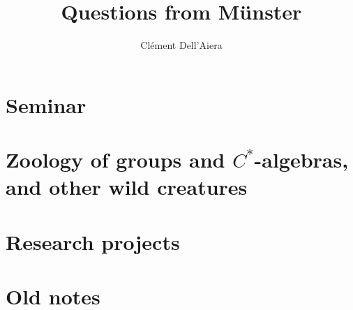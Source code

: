 \documentclass[a4paper,12pt]{book}
\title{\textbf{Questions from Münster}}
\date{}
\author{ Clément Dell'Aiera}
\begin{document}
\maketitle

\pagestyle{plain}
\tableofcontents

\pagestyle{fancy}
\chapter{Seminar}


\chapter{Zoology of groups and $C^*$-algebras, and other wild creatures}




\chapter{Research projects}


\newpage
\chapter{Old notes}





%

%
% 
\end{document}
